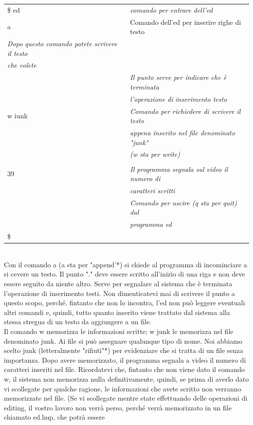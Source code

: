 \begin{tabular}{ll}
	\$ ed & {\it comando per entrare dell'ed}\\
	a & {Comando dell'ed per inserire righe di testo}\\
	{\it Dopo questo comando potete scrivere il testo}\\
	{\it che volete}\\
	& {\it Il punto serve per indicare che è terminata}\\
	& {\it l'operazione di inserimento testo}\\
	w iunk&{\it Comando per richiedere di scrivere il testo}\\
	&{\it appena inserito nel file denominato "junk"}\\
	& {\it (w sta per write)}\\\\
	39&{\it Il programma segnala sul video il numero di}\\
	& {\it caratteri scritti}\\
	&{\it Comando per uscire (q sta per quit) dal}\\
	&{\it programma ed}\\
	\$
\end{tabular}\\
Con il comando a (a sta per "append'*) si chiede al programma di incominciare a ri
cevere un testo. Il punto "." deve essere scritto all'inizio di una riga e non deve essere
seguito da niente altro. Serve per segnalare al sistema che è terminata l'operazione di
inserimento testi. Non dimenticatevi mai di scrivere il punto a questo scopo, perché.
fintanto che non lo incontra, l'ed non può leggere eventuali altri comandi e, quindi,
tutto quanto inserito viene trattato dal sistema alla stessa stregua di un testo da 
aggiungere a un file.\\
Il comando w memorizza le informazioni scritte; w junk le memorizza nel file denominato
junk. Ai file si può assegnare qualunque tipo di nome. Noi abbiamo scelto junk
(letteralmente "rifiuti"*) per evidenziare che si tratta di un file senza importanza.
Dopo avere memorizzato, il programma segnala a video il numero di caratteri inseriti 
nel file. Ricordatevi che, fintanto che non viene dato il comando w, il sistema non
memorizza nulla definitivamente, quindi, se prima di averlo dato vi scollegate per
qualche ragione, le informazioni che avete scritto non verranno memorizzate nel file.
(Se vi scollegate mentre state effettuando delle operazioni di editing, il vostro lavoro
non verrà perso, perché verrà memorizzato in un file chiamato ed.hup, che potrà essere
